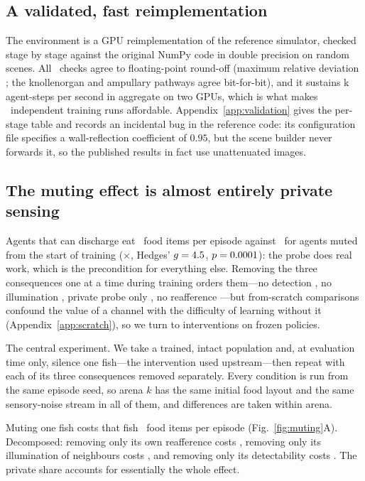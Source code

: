 \subsection{A validated, fast reimplementation}

The environment is a GPU reimplementation of the reference simulator, checked
stage by stage against the original NumPy code in double precision on random
scenes. All \ValNChecks\ checks agree to floating-point round-off (maximum
relative deviation \ValMaxErr; the knollenorgan and ampullary pathways agree
bit-for-bit), and it sustains \ThroughputK{}k agent-steps per second in aggregate
on two GPUs, which is what makes \NumRuns\ independent training runs affordable.
Appendix~\ref{app:validation} gives the per-stage table and records an incidental
bug in the reference code: its configuration file specifies a wall-reflection
coefficient of $0.95$, but the scene builder never forwards it, so the published
results in fact use unattenuated images.

\subsection{The muting effect is almost entirely private sensing}

Agents that can discharge eat \FullEaten\ food items per episode against
\SilentEaten\ for agents muted from the start of training (\ProbeGain$\times$,
Hedges' $g=4.5$, $p=0.0001$): the probe does real work, which is the
precondition for everything else. Removing the three consequences one at a time
during training orders them---no detection \NoKnollenEaten, no illumination
\NoIllumEaten, private probe only \PrivateEaten, no reafference
\NoSelfEaten---but from-scratch comparisons confound the value of a channel with
the difficulty of learning without it (Appendix~\ref{app:scratch}), so we turn to
interventions on frozen policies.

The central experiment. We take a trained, intact population and, at evaluation
time only, silence one fish---the intervention used upstream---then repeat with
each of its three consequences removed separately. Every condition is run from the
same episode seed, so arena $k$ has the same initial food layout and the same
sensory-noise stream in all of them, and differences are taken within arena.

Muting one fish costs that fish \MuteTargetTotal\ food items per episode
(Fig.~\ref{fig:muting}A). Decomposed: removing only its own reafference costs
\MuteTargetPriv, removing only its illumination of neighbours costs
\MuteTargetCue, and removing only its detectability costs \MuteTargetSig. The
private share accounts for essentially the whole effect.

